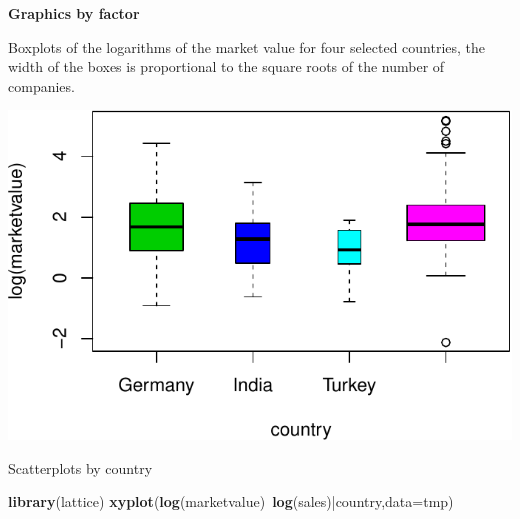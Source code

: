 \documentclass[]{article}
\newenvironment{Shaded}{\begin{snugshade}}{\end{snugshade}}
\newcommand{\KeywordTok}[1]{\textcolor[rgb]{0.13,0.29,0.53}{\textbf{{#1}}}}
\newcommand{\DataTypeTok}[1]{\textcolor[rgb]{0.13,0.29,0.53}{{#1}}}
\newcommand{\DecValTok}[1]{\textcolor[rgb]{0.00,0.00,0.81}{{#1}}}
\newcommand{\StringTok}[1]{\textcolor[rgb]{0.31,0.60,0.02}{{#1}}}
\newcommand{\OtherTok}[1]{\textcolor[rgb]{0.56,0.35,0.01}{{#1}}}
\newcommand{\NormalTok}[1]{{#1}}
\numberwithin{equation}{section}
\begin{document}
\textbf{Graphics by factor}

Boxplots of the logarithms of the market value for four selected
countries, the width of the boxes is proportional to the square roots of
the number of companies.

\begin{Shaded}
\end{Shaded}

\includegraphics{index_files/figure-latex/unnamed-chunk-256-1.pdf}

Scatterplots by country

\begin{Shaded}
\begin{Highlighting}[]
\KeywordTok{library}\NormalTok{(lattice)}
\KeywordTok{xyplot}\NormalTok{(}\KeywordTok{log}\NormalTok{(marketvalue)~}\KeywordTok{log}\NormalTok{(sales)|country,}\DataTypeTok{data=}\NormalTok{tmp)}
\end{Highlighting}
\end{Shaded}
\end{document}
